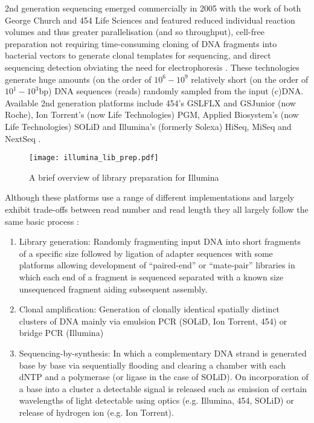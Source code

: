 2nd generation sequencing emerged commercially in 2005 with the work
of both George Church and 454 Life Sciences \citep{Margulies2005} and featured
reduced individual reaction volumes and thus greater parallelisation (and so throughput),
cell-free preparation not requiring time-consuming cloning of DNA fragments into bacterial vectors to generate
clonal templates for sequencing, and direct sequencing detection obviating the need
for electrophoresis \citep{Jaszczyszyn2014}.
These technologies generate huge amounts (on the order of \(10^{6}-10^{9}\) relatively short (on the order of \(10^{1}-10^{3}\)bp) DNA sequences 
    (reads) randomly sampled from the input (c)DNA.  
Available 2nd generation platforms include 454's GSLFLX and GSJunior (now Roche),
Ion Torrent's (now Life Technologies) PGM, Applied Biosystem's (now Life Technologies) SOLiD and Illumina's (formerly Solexa) 
HiSeq, MiSeq and NextSeq \citep{Nederbragt2013}.

\begin{figure}
    \texttt{[image: illumina\_lib\_prep.pdf]}
    \label{fig:libprep}
    \caption{A brief overview of library preparation for Illumina}
\end{figure}


Although these platforms use a range of different implementations and largely exhibit trade-offs between read number and read length they all largely follow the same basic process \citep{Shendure2008}:
\begin{enumerate}
        \item Library generation: Randomly fragmenting input DNA into short fragments of a specific size
            followed by ligation of adapter sequences with some platforms allowing development of ``paired-end'' or ``mate-pair'' libraries in which
            each end of a fragment is sequenced separated with a known size unsequenced fragment aiding subsequent assembly.
        \item Clonal amplification: Generation of clonally identical spatially distinct clusters of DNA mainly via emulsion PCR \citep{Dressman2003} (SOLiD, Ion Torrent, 454)
            or bridge PCR \citep{Adessi2000,Fedurco2006} (Illumina) 
        \item Sequencing-by-synthesis: In which a complementary DNA strand is generated base by base via sequentially flooding and clearing a
            chamber with each dNTP and a polymerase (or ligase in the case of SOLiD).  On incorporation of a base into a cluster a detectable signal is released such as emission of certain wavelengths of light 
detectable using optics (e.g. Illumina, 454, SOLiD) or release of hydrogen ion (e.g. Ion Torrent).
\end{enumerate}

